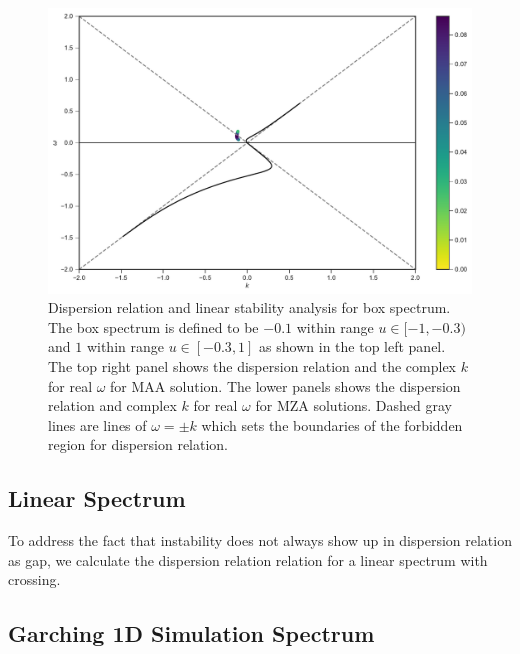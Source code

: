 \documentclass[%
preprint,
 amsmath,amssymb,
 aps,
 prd
]{revtex4-1}
\begin{document}
\begin{figure}
   \endminipage\hfill
   \includegraphics[width=\linewidth]{assets/spectBoxC1MZAmDRPlt.pdf}
   \endminipage\hfill
   \caption{Dispersion relation and linear stability analysis for box spectrum. The box spectrum is defined to be $-0.1$ within range $u\in [-1,-0.3)$ and $1$ within range $u\in [-0.3,1]$ as shown in the top left panel. The top right panel shows the dispersion relation and the complex $k$ for real $\omega$ for MAA solution. The lower panels shows the dispersion relation and complex $k$ for real $\omega$ for MZA solutions. Dashed gray lines are lines of $\omega= \pm k$ which sets the boundaries of the forbidden region for dispersion relation.
    }
   \label{fig-box-c1}
\end{figure}


\subsection{\label{sec-linear-spectrum}Linear Spectrum}


To address the fact that instability does not always show up in dispersion relation as gap, we calculate the dispersion relation relation for a linear spectrum with crossing.


\subsection{\label{sec-garching}Garching 1D Simulation Spectrum}
\end{document}
